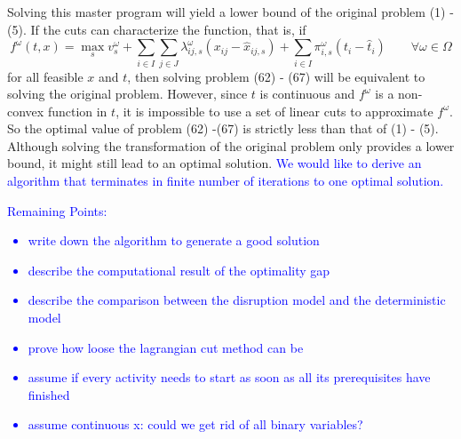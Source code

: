 \documentclass[11pt]{article}
\begin{document}
	Solving this master program will yield a lower bound of the original problem (1) - (5). If the cuts can characterize the function, that is, if \[f^\omega(t,x) = \max_{s} v_{s}^\omega + \sum_{i \in I}\sum_{j \in J}\lambda_{ij,s}^\omega (x_{ij} - \hat{x}_{ij,s}) + \sum_{i \in I} \pi_{i,s}^\omega(t_i - \hat{t}_i) \qquad \forall \omega \in \Omega\]
	for all feasible \(x\) and \(t\), then solving problem (62) - (67) will be equivalent to solving the original problem. However, since \(t\) is continuous and \(f^\omega\) is a non-convex function in \(t\), it is impossible to use a set of linear cuts to approximate \(f^\omega\). So the optimal value of problem (62) -(67) is strictly less than that of (1) - (5).\\
	\newline Although solving the transformation of the original problem only provides a lower bound, it might still lead to an optimal solution. \textcolor{blue}{We would like to derive an algorithm that terminates in finite number of iterations to one optimal solution.}
	
	\textcolor{blue}{Remaining Points:
	\begin{itemize}
		\item write down the algorithm to generate a good solution
		\item describe the computational result of the optimality gap
		\item describe the comparison between the disruption model and the deterministic model
		\item prove how loose the lagrangian cut method can be
		\item assume if every activity needs to start as soon as all its prerequisites have finished
		\item assume continuous x: could we get rid of all binary variables?
	\end{itemize}
	}



\end{document}
